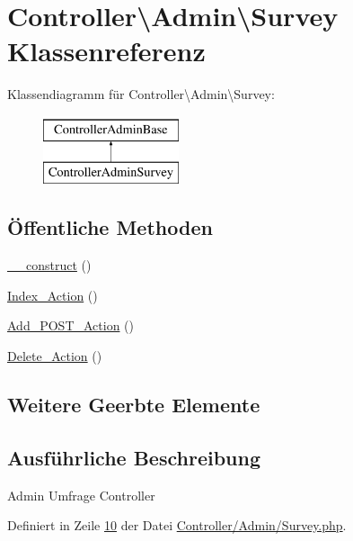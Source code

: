 \hypertarget{class_controller_1_1_admin_1_1_survey}{\section{Controller\textbackslash{}Admin\textbackslash{}Survey Klassenreferenz}
\label{class_controller_1_1_admin_1_1_survey}
}
Klassendiagramm für Controller\textbackslash{}Admin\textbackslash{}Survey\-:\begin{figure}[H]
\begin{center}
\leavevmode
\includegraphics[height=2.000000cm]{class_controller_1_1_admin_1_1_survey}
\end{center}
\end{figure}
\subsection*{Öffentliche Methoden}
\begin{DoxyCompactItemize}
\item 
\hyperlink{class_controller_1_1_admin_1_1_survey_af87ac54e8b5b29bb33fb0897f9de547a}{\-\_\-\-\_\-construct} ()
\item 
\hyperlink{class_controller_1_1_admin_1_1_survey_ab79ba5fab3d2048a72c71fcd3176dd72}{Index\-\_\-\-Action} ()
\item 
\hyperlink{class_controller_1_1_admin_1_1_survey_a618d9d0d906df279c7b34ae9458fa977}{Add\-\_\-\-P\-O\-S\-T\-\_\-\-Action} ()
\item 
\hyperlink{class_controller_1_1_admin_1_1_survey_aeb20127715fb6ab072bf09e0aa69e9f3}{Delete\-\_\-\-Action} ()
\end{DoxyCompactItemize}
\subsection*{Weitere Geerbte Elemente}


\subsection{Ausführliche Beschreibung}
Admin Umfrage Controller 

Definiert in Zeile \hyperlink{_controller_2_admin_2_survey_8php_source_l00010}{10} der Datei \hyperlink{_controller_2_admin_2_survey_8php_source}{Controller/\-Admin/\-Survey.\-php}.




